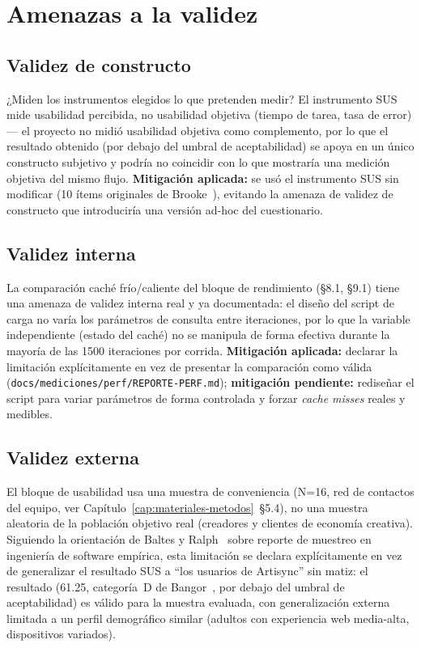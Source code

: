\chapter{Amenazas a la validez}
\label{cap:validez}

\section{Validez de constructo}

¿Miden los instrumentos elegidos lo que pretenden medir? El instrumento
SUS mide usabilidad percibida, no usabilidad objetiva (tiempo de tarea,
tasa de error) --- el proyecto no midió usabilidad objetiva como
complemento, por lo que el resultado obtenido (por debajo del umbral de
aceptabilidad) se apoya en un único constructo subjetivo y podría no
coincidir con lo que mostraría una medición objetiva del mismo flujo.
\textbf{Mitigación aplicada:} se
usó el instrumento SUS sin modificar (10 ítems originales de
Brooke~\cite{BROOKE1996}), evitando la amenaza de validez de constructo
que introduciría una versión ad-hoc del cuestionario.

\section{Validez interna}

La comparación caché frío/caliente del bloque de rendimiento (\S8.1,
\S9.1) tiene una amenaza de validez interna real y ya documentada: el
diseño del script de carga no varía los parámetros de consulta entre
iteraciones, por lo que la variable independiente (estado del caché) no
se manipula de forma efectiva durante la mayoría de las 1500 iteraciones
por corrida. \textbf{Mitigación aplicada:} declarar la limitación
explícitamente en vez de presentar la comparación como válida
(\texttt{docs/mediciones/perf/REPORTE-PERF.md}); \textbf{mitigación
pendiente:} rediseñar el script para variar parámetros de forma
controlada y forzar \emph{cache misses} reales y medibles.

\section{Validez externa}

El bloque de usabilidad usa una muestra de conveniencia (N=16, red de
contactos del equipo, ver Capítulo~\ref{cap:materiales-metodos}~\S5.4), no
una muestra aleatoria de la población objetivo real (creadores y clientes
de economía creativa). Siguiendo la orientación de Baltes y
Ralph~\cite{BALTES2022} sobre reporte de muestreo en ingeniería de
software empírica, esta limitación se declara explícitamente en vez de
generalizar el resultado SUS a ``los usuarios de Artisync'' sin matiz: el
resultado (61.25, categoría~D de Bangor~\cite{BANGOR2009}, por debajo del
umbral de aceptabilidad) es válido para
la muestra evaluada, con generalización externa limitada a un perfil
demográfico similar (adultos con experiencia web media-alta, dispositivos
variados).

